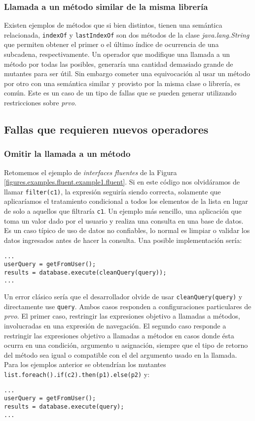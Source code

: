 \subsubsection{Llamada a un m\'etodo similar de la misma librer\'ia}

Existen ejemplos de m\'etodos que si bien distintos, tienen una sem\'antica relacionada, \texttt{indexOf} y \texttt{lastIndexOf} son dos m\'etodos de la clase \emph{java.lang.String} que permiten obtener el primer o el \'ultimo \'indice de ocurrencia de una subcadena, respectivamente. Un operador que modifique una llamada a un m\'etodo por todas las posibles, generar\'ia una cantidad demasiado grande de mutantes para ser \'util. Sin embargo cometer una equivocaci\'on al usar un m\'etodo por otro con una sem\'antica similar y provisto por la misma clase o librer\'ia, es com\'un. Este es un caso de un tipo de fallas que se pueden generar utilizando restricciones sobre \emph{prvo}.

\subsection{Fallas que requieren nuevos operadores}

\subsubsection{Omitir la llamada a un m\'etodo}

Retomemos el ejemplo de \emph{interfaces fluentes} de la Figura \ref{figures.examples.fluent.example1.fluent}. Si en este c\'odigo nos olvid\'aramos de llamar \texttt{filter(c1)}, la expresi\'on seguir\'ia siendo correcta, solamente que aplicar\'iamos el tratamiento condicional a todos los elementos de la lista en lugar de solo a aquellos que filtrar\'ia \texttt{c1}. Un ejemplo m\'as sencillo, una aplicaci\'on que toma un valor dado por el usuario y realiza una consulta en una base de datos. Es un caso t\'ipico de uso de datos no confiables, lo normal es limpiar o validar los datos ingresados antes de hacer la consulta. Una posible implementaci\'on ser\'ia:
\begin{lstlisting}
...
userQuery = getFromUser();
results = database.execute(cleanQuery(query));
...
\end{lstlisting}
Un error cl\'asico ser\'ia que el desarrollador olvide de usar \texttt{cleanQuery(query)} y directamente use \texttt{query}. Ambos casos responden a configuraciones particulares de \emph{prvo}. El primer caso, restringir las expresiones objetivo a llamadas a m\'etodos, involucradas en una expresi\'on de navegaci\'on. El segundo caso responde a restringir las expresiones objetivo a llamadas a m\'etodos en casos donde \'esta ocurra en una condici\'on, argumento u asignaci\'on, siempre que el tipo de retorno del m\'etodo sea igual o compatible con el del argumento usado en la llamada. Para los ejemplos anterior se obtendr\'ian los mutantes \lstinline|list.foreach().if(c2).then(p1).else(p2)| y:
\begin{lstlisting}
...
userQuery = getFromUser();
results = database.execute(query);
...
\end{lstlisting}


